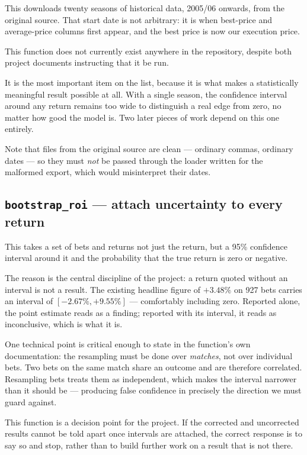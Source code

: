 \documentclass[11pt,a4paper]{article}
\newcommand{\code}[1]{\texttt{#1}}
\begin{document}
This downloads twenty seasons of historical data, 2005/06 onwards, from the
original source. That start date is not arbitrary: it is when best-price and
average-price columns first appear, and the best price is now our execution
price.

This function does not currently exist anywhere in the repository, despite
both project documents instructing that it be run.

It is the most important item on the list, because it is what makes a
statistically meaningful result possible at all. With a single season, the
confidence interval around any return remains too wide to distinguish a real
edge from zero, no matter how good the model is. Two later pieces of work
depend on this one entirely.

Note that files from the original source are clean --- ordinary commas, ordinary
dates --- so they must \emph{not} be passed through the loader written for the
malformed export, which would misinterpret their dates.

\subsection{\code{bootstrap\_roi} --- attach uncertainty to every return}

This takes a set of bets and returns not just the return, but a 95\%
confidence interval around it and the probability that the true return is
zero or negative.

The reason is the central discipline of the project: a return quoted without
an interval is not a result. The existing headline figure of $+3.48\%$ on 927
bets carries an interval of $[-2.67\%, +9.55\%]$ --- comfortably including
zero. Reported alone, the point estimate reads as a finding; reported with its
interval, it reads as inconclusive, which is what it is.

One technical point is critical enough to state in the function's own
documentation: the resampling must be done over \emph{matches}, not over
individual bets. Two bets on the same match share an outcome and are
therefore correlated. Resampling bets treats them as independent, which makes
the interval narrower than it should be --- producing false confidence in
precisely the direction we must guard against.

This function is a decision point for the project. If the corrected and
uncorrected results cannot be told apart once intervals are attached, the
correct response is to say so and stop, rather than to build further work on
a result that is not there.
\end{document}
